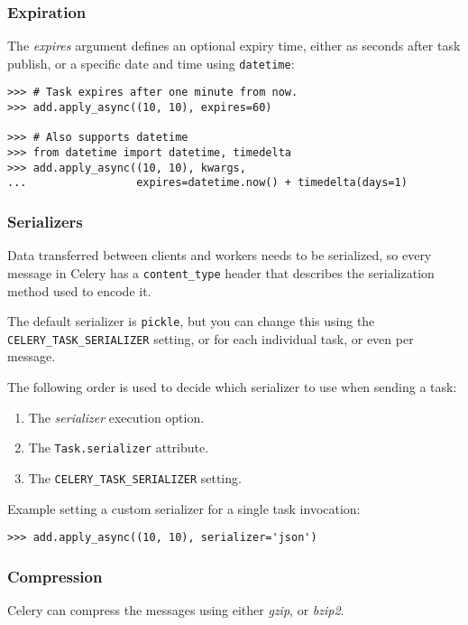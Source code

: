 \documentclass[9pt,a4paper]{article}
\begin{document}
\begin{CJK*}{GBK}{kai}
\subsubsection{Expiration}
The \textit{expires} argument defines an optional expiry time, either as seconds after task publish, or a specific date and time using \verb"datetime":

\begin{Verbatim}[frame=single]
>>> # Task expires after one minute from now.
>>> add.apply_async((10, 10), expires=60)

>>> # Also supports datetime
>>> from datetime import datetime, timedelta
>>> add.apply_async((10, 10), kwargs,
...                 expires=datetime.now() + timedelta(days=1)
\end{Verbatim}

\subsubsection{Serializers}
Data transferred between clients and workers needs to be serialized, so every message in Celery has a \verb"content_type" header that describes the serialization method used to encode it.

The default serializer is \verb"pickle", but you can change this using the \verb"CELERY_TASK_SERIALIZER" setting, or for each individual task, or even per message.

The following order is used to decide which serializer to use when sending a task:

\begin{enumerate}
\item The \textit{serializer} execution option.
\item The \verb"Task.serializer" attribute.
\item The \verb"CELERY_TASK_SERIALIZER" setting.
\end{enumerate}

Example setting a custom serializer for a single task invocation:

\begin{Verbatim}[frame=single]
>>> add.apply_async((10, 10), serializer='json')
\end{Verbatim}

\subsubsection{Compression}
Celery can compress the messages using either \textit{gzip}, or \textit{bzip2}.


\end{CJK*}
\end{document}
